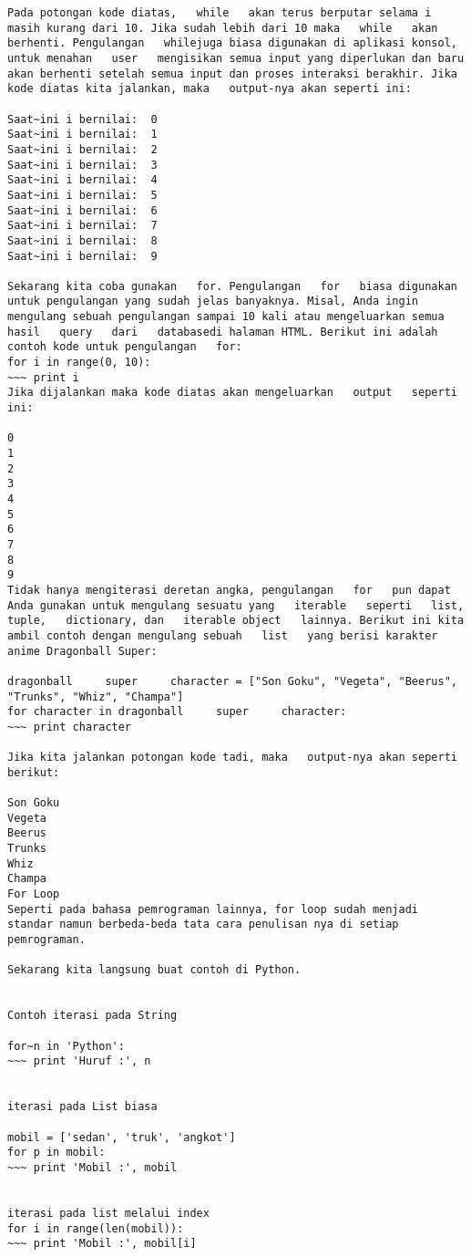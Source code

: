 \begin{verbatim}
Pada potongan kode diatas,   while   akan terus berputar selama i masih kurang dari 10. Jika sudah lebih dari 10 maka   while   akan berhenti. Pengulangan   whilejuga biasa digunakan di aplikasi konsol, untuk menahan   user   mengisikan semua input yang diperlukan dan baru akan berhenti setelah semua input dan proses interaksi berakhir. Jika kode diatas kita jalankan, maka   output-nya akan seperti ini: 

Saat~ini i bernilai:  0 
Saat~ini i bernilai:  1 
Saat~ini i bernilai:  2 
Saat~ini i bernilai:  3 
Saat~ini i bernilai:  4 
Saat~ini i bernilai:  5 
Saat~ini i bernilai:  6 
Saat~ini i bernilai:  7 
Saat~ini i bernilai:  8 
Saat~ini i bernilai:  9 

Sekarang kita coba gunakan   for. Pengulangan   for   biasa digunakan untuk pengulangan yang sudah jelas banyaknya. Misal, Anda ingin mengulang sebuah pengulangan sampai 10 kali atau mengeluarkan semua hasil   query   dari   databasedi halaman HTML. Berikut ini adalah contoh kode untuk pengulangan   for: 
for i in range(0, 10): 
~~~ print i 
Jika dijalankan maka kode diatas akan mengeluarkan   output   seperti ini: 

0 
1 
2 
3 
4 
5 
6 
7 
8 
9 
Tidak hanya mengiterasi deretan angka, pengulangan   for   pun dapat Anda gunakan untuk mengulang sesuatu yang   iterable   seperti   list,   tuple,   dictionary, dan   iterable object   lainnya. Berikut ini kita ambil contoh dengan mengulang sebuah   list   yang berisi karakter anime Dragonball Super: 

dragonball     super     character = ["Son Goku", "Vegeta", "Beerus", "Trunks", "Whiz", "Champa"] 
for character in dragonball     super     character: 
~~~ print character 

Jika kita jalankan potongan kode tadi, maka   output-nya akan seperti berikut: 

Son Goku 
Vegeta 
Beerus 
Trunks 
Whiz 
Champa 
For Loop 
Seperti pada bahasa pemrograman lainnya, for loop sudah menjadi standar namun berbeda-beda tata cara penulisan nya di setiap pemrograman. 

Sekarang kita langsung buat contoh di Python.    


Contoh iterasi pada String  

for~n in 'Python':   
~~~ print 'Huruf :', n 

  
iterasi pada List biasa 

mobil = ['sedan', 'truk', 'angkot']  
for p in mobil: 
~~~ print 'Mobil :', mobil 


iterasi pada list melalui index 
for i in range(len(mobil)): 
~~~ print 'Mobil :', mobil[i] 


\end{verbatim}
